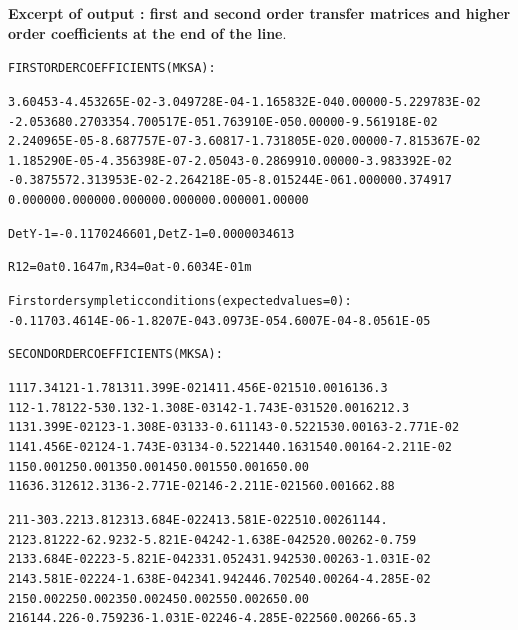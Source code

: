 \begin{tiny}
\noindent \textbf{\normalsize Excerpt of \zgoubi output : first and second order transfer matrices and higher 
order coefficients at the end of the line}.

\begin{alltt}
               FIRST  ORDER  COEFFICIENTS  ( MKSA ):

           3.60453       -4.453265E-02   -3.049728E-04   -1.165832E-04     0.00000       -5.229783E-02
          -2.05368        0.270335        4.700517E-05    1.763910E-05     0.00000       -9.561918E-02
          2.240965E-05   -8.687757E-07    -3.60817       -1.731805E-02     0.00000       -7.815367E-02
          1.185290E-05   -4.356398E-07    -2.05043       -0.286991         0.00000       -3.983392E-02
         -0.387557        2.313953E-02   -2.264218E-05   -8.015244E-06     1.00000        0.374917
           0.00000         0.00000         0.00000         0.00000         0.00000         1.00000

          DetY-1 =      -0.1170246601,    DetZ-1 =       0.0000034613

          R12=0 at   0.1647     m,        R34=0 at  -0.6034E-01 m

      First order sympletic conditions (expected values = 0) :
        -0.1170        3.4614E-06   -1.8207E-04    3.0973E-05    4.6007E-04   -8.0561E-05

               SECOND  ORDER  COEFFICIENTS  ( MKSA ):

   1 11   7.34       1 21  -1.78       1 31  1.399E-02   1 41  1.456E-02   1 51   0.00       1 61   36.3
   1 12  -1.78       1 22  -530.       1 32 -1.308E-03   1 42 -1.743E-03   1 52   0.00       1 62   12.3
   1 13  1.399E-02   1 23 -1.308E-03   1 33 -0.611       1 43 -0.522       1 53   0.00       1 63 -2.771E-02
   1 14  1.456E-02   1 24 -1.743E-03   1 34 -0.522       1 44  0.163       1 54   0.00       1 64 -2.211E-02
   1 15   0.00       1 25   0.00       1 35   0.00       1 45   0.00       1 55   0.00       1 65   0.00
   1 16   36.3       1 26   12.3       1 36 -2.771E-02   1 46 -2.211E-02   1 56   0.00       1 66   2.88


   2 11  -303.       2 21   3.81       2 31  3.684E-02   2 41  3.581E-02   2 51   0.00       2 61   144.
   2 12   3.81       2 22  -62.9       2 32 -5.821E-04   2 42 -1.638E-04   2 52   0.00       2 62 -0.759
   2 13  3.684E-02   2 23 -5.821E-04   2 33   1.05       2 43   1.94       2 53   0.00       2 63 -1.031E-02
   2 14  3.581E-02   2 24 -1.638E-04   2 34   1.94       2 44   6.70       2 54   0.00       2 64 -4.285E-02
   2 15   0.00       2 25   0.00       2 35   0.00       2 45   0.00       2 55   0.00       2 65   0.00
   2 16   144.       2 26 -0.759       2 36 -1.031E-02   2 46 -4.285E-02   2 56   0.00       2 66  -65.3



\end{alltt}
\end{tiny}
